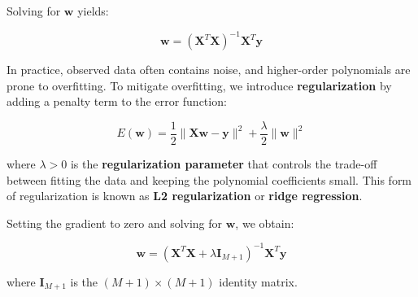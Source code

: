 Solving for $\mathbf{w}$ yields:

\[
    \mathbf{w} = (\mathbf{X}^T\mathbf{X})^{-1}\mathbf{X}^{T}\mathbf{y} \tag{3.5}
\]

In practice, observed data often contains noise, and higher-order polynomials are prone to overfitting.
To mitigate overfitting, we introduce \textbf{regularization} by adding a penalty term to the error function:

\[
    E(\mathbf{w}) = \frac{1}{2} \|\mathbf{Xw} - \mathbf{y}\|^2 + \frac{\lambda}{2}\|\mathbf{w}\|^2 \tag{3.6}
\]

where $\lambda > 0$ is the \textbf{regularization parameter} that controls the trade-off between fitting the data and keeping the polynomial coefficients small.
This form of regularization is known as \textbf{L2 regularization} or \textbf{ridge regression}.

Setting the gradient to zero and solving for $\mathbf{w}$, we obtain:

\[
    \mathbf{w} = (\mathbf{X}^T\mathbf{X} + \lambda\mathbf{I}_{M+1})^{-1}\mathbf{X}^T\mathbf{y} \tag{3.7}
\]

where $\mathbf{I}_{M+1}$ is the $(M+1) \times (M+1)$ identity matrix.